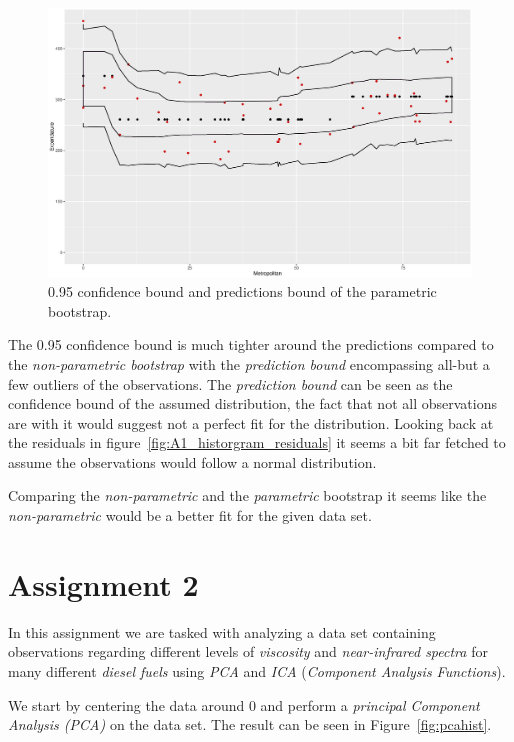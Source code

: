 \documentclass[a4paper,12pt]{article}
\begin{document}
    \begin{figure}[H]
    \centering
    \includegraphics[width=\textwidth]{figures/A1_parametric}  
    \caption{0.95 confidence bound and predictions bound of the parametric bootstrap. \label{fig:A1_parametric}}
    \end{figure}
    The 0.95 confidence bound is much tighter around the predictions compared to the \textit{non-parametric bootstrap} with the \textit{prediction bound} encompassing all-but a few outliers of the observations. The \textit{prediction bound} can be seen as the confidence bound of the assumed distribution, the fact that not all observations are with it would suggest not a perfect fit for the distribution. Looking back at the residuals in figure~\ref{fig:A1_historgram_residuals} it seems a bit far fetched to assume the observations would follow a normal distribution.

    Comparing the \textit{non-parametric} and the \textit{parametric} bootstrap it seems like the \textit{non-parametric} would be a better fit for the given data set. 


    \section{Assignment 2}
    In this assignment we are tasked with analyzing a data set containing observations regarding different levels of \emph{viscosity} and \emph{near-infrared spectra} for many different \emph{diesel fuels} using \emph{PCA} and \emph{ICA} (\emph{Component Analysis Functions}).

    We start by centering the data around 0 and perform a \emph{principal Component Analysis (PCA)} on the data set. The result can be seen in Figure~\ref{fig:pcahist}.
\end{document}
